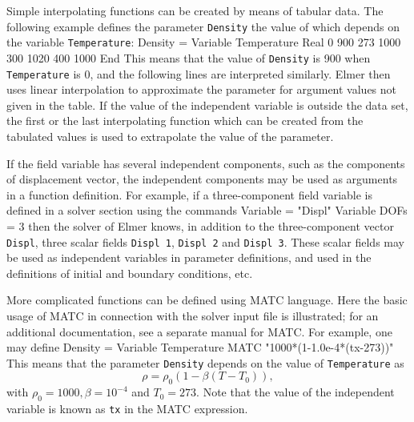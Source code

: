 Simple interpolating functions can be created by means of tabular data. The following example
defines the parameter {\tt Density} the value of which depends on the variable 
{\tt Temperature}:
\ttbegin
Density = Variable Temperature
  Real
    0    900
    273 1000
    300 1020
    400 1000
End
\ttend
This means that the value of {\tt Density} is 900 when {\tt Temperature} is 0, and
the following lines are interpreted similarly. Elmer then uses linear interpolation
to approximate the parameter for argument values not given in the table.
If the value of the independent variable is outside the data set,
the first or the last interpolating function which can be created from the
tabulated values is used to extrapolate the value of the parameter. 

If the field variable has several independent components, such as the components of
displacement vector, the independent components may be used as arguments in 
a function definition.  
For example, if a three-component field variable is defined in a solver section
using the commands
\ttbegin
Variable = "Displ"
Variable DOFs = 3
\ttend
then the solver of Elmer knows, in addition to the three-component vector {\tt Displ}, 
three scalar fields {\tt Displ 1}, {\tt Displ 2} and {\tt Displ 3}. 
These scalar fields may be used as independent variables in parameter definitions,
and used in the definitions of initial and boundary conditions, etc.

More complicated functions can be defined using MATC language. Here the basic usage 
of MATC in connection with the solver input file is illustrated; 
for an additional documentation, see a separate manual for MATC. For example,
one may define
\ttbegin
Density = Variable Temperature
  MATC "1000*(1-1.0e-4*(tx-273))"
\ttend
This means that the parameter {\tt Density} depends on the value of {\tt Temperature} as
\begin{equation}
  \rho =  \rho_0(1-\beta(T-T_0)),
\end{equation}
with $\rho_0=1000, \beta=10^{-4}$ and $T_0=273$. Note that
the value of the independent variable is known as {\tt tx} in the MATC expression.

